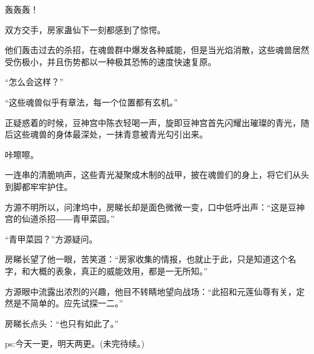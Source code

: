 \begin{this_body}
轰轰轰！

双方交手，房家蛊仙下一刻都感到了惊愕。

他们轰击过去的杀招，在魂兽群中爆发各种威能，但是当光焰消散，这些魂兽居然受伤极小，并且伤势都以一种极其恐怖的速度快速复原。

“怎么会这样？”

“这些魂兽似乎有章法，每一个位置都有玄机。”

正疑惑着的时候，豆神宫中陈衣轻喝一声，旋即豆神宫首先闪耀出璀璨的青光，随后这些魂兽的身体最深处，一抹青意被青光勾引出来。

咔嚓嚓。

一连串的清脆响声，这些青光凝聚成木制的战甲，披在魂兽们的身上，将它们从头到脚都牢牢护住。

方源不明所以，问津坞中，房睇长却是面色微微一变，口中低呼出声：“这是豆神宫的仙道杀招――青甲菜园。”

“青甲菜园？”方源疑问。

房睇长望了他一眼，苦笑道：“房家收集的情报，也就止于此，只是知道这个名字，和大概的表象，真正的威能效用，都是一无所知。”

方源眼中流露出浓烈的兴趣，他目不转睛地望向战场：“此招和元莲仙尊有关，定然是不简单的。应先试探一二。”

房睇长点头：“也只有如此了。”

ps:今天一更，明天两更。(未完待续。)

\end{this_body}

